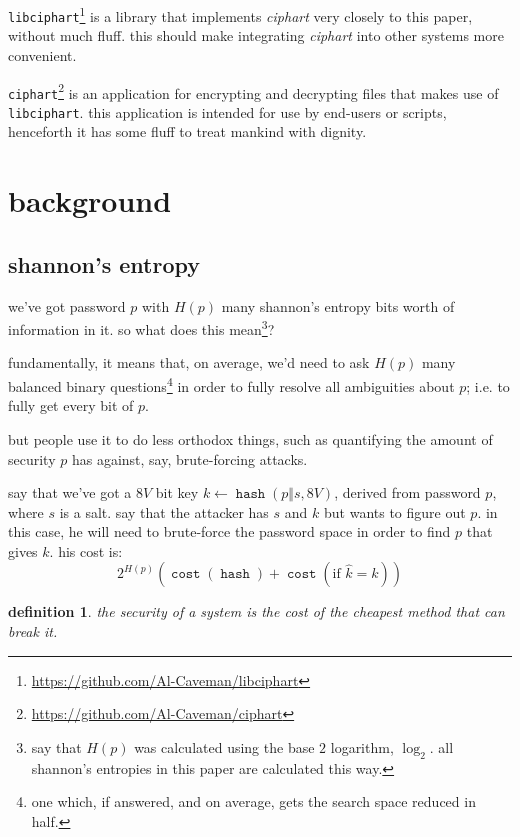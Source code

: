 \documentclass[twocolumn]{article}
\newtheorem{definition}{definition}
\DeclareMathOperator{\hash}{\mathtt{hash}}
\DeclareMathOperator{\cost}{\mathtt{cost}}
\begin{document}
\texttt{libciphart}\footnote{\url{https://github.com/Al-Caveman/libciphart}}
is a library that implements \emph{ciphart} very closely to this paper,
without much fluff.  this should make integrating \emph{ciphart} into other
systems more convenient.

\texttt{ciphart}\footnote{\url{https://github.com/Al-Caveman/ciphart}} is
an application for encrypting and decrypting files that makes use of
\texttt{libciphart}.  this application is intended for use by end-users or
scripts, henceforth it has some fluff to treat mankind with dignity.

\break
\tableofcontents

\section{background}
\subsection{shannon's entropy}
we've got password $p$ with $H(p)$ many shannon's entropy bits worth of
information in it.  so what does this mean\footnote{say that $H(p)$ was
calculated using the base $2$ logarithm, $\log_2$.  all shannon's entropies
in this paper are calculated this way.}?

fundamentally, it means that, on average, we'd need to ask $H(p)$ many
balanced binary questions\footnote{one which, if answered, and on average,
gets the search space reduced in half.} in order to fully resolve all
ambiguities about $p$; i.e.  to fully get every bit of $p$.

but people use it to do less orthodox things, such as quantifying the
amount of security $p$ has against, say, brute-forcing attacks.

say that we've got a $8V$ bit key $k \gets \hash(p \Vert s, 8V)$, derived
from password $p$, where $s$ is a salt.  say that the attacker has $s$ and
$k$ but wants to figure out $p$.  in this case, he will need to brute-force
the password space in order to find $p$ that gives $k$.  his cost is:
\begin{equation}\label{eq_cost_passbruteforce}
    2^{H(p)} \left(
        \cost(\hash) + \cost(\text{if } \hat k = k)
    \right)
\end{equation}

\begin{definition}
the security of a system is the cost of the cheapest method that can break
it.
\end{definition}
\end{document}

